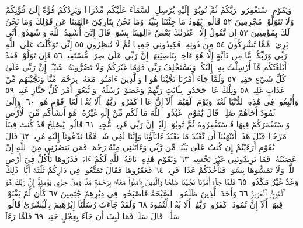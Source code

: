 وَيَٰقَوْمِ ٱسْتَغْفِرُوا۟ رَبَّكُمْ ثُمَّ تُوبُوٓا۟ إِلَيْهِ يُرْسِلِ ٱلسَّمَآءَ
عَلَيْكُم مِّدْرَارࣰا وَيَزِدْكُمْ قُوَّةً إِلَىٰ قُوَّتِكُمْ وَلَا تَتَوَلَّوْا۟
مُجْرِمِينَ ٥٢ قَالُوا۟ يَٰهُودُ مَا جِئْتَنَا بِبَيِّنَةࣲ وَمَا نَحْنُ
بِتَارِكِيٓ ءَالِهَتِنَا عَن قَوْلِكَ وَمَا نَحْنُ لَكَ بِمُؤْمِنِينَ ٥٣
إِن نَّقُولُ إِلَّا ٱعْتَرَىٰكَ بَعْضُ ءَالِهَتِنَا بِسُوٓءࣲۗ قَالَ إِنِّيٓ أُشْهِدُ ٱللَّهَ
وَٱشْهَدُوٓا۟ أَنِّي بَرِيٓءࣱ مِّمَّا تُشْرِكُونَ ٥٤ مِن دُونِهِۦۖ فَكِيدُونِي
جَمِيعࣰا ثُمَّ لَا تُنظِرُونِ ٥٥ إِنِّي تَوَكَّلْتُ عَلَى ٱللَّهِ رَبِّي وَرَبِّكُمۚ مَّا مِن
دَآبَّةٍ إِلَّا هُوَ ءَاخِذُۢ بِنَاصِيَتِهَآۚ إِنَّ رَبِّي عَلَىٰ صِرَٰطࣲ مُّسْتَقِيمࣲ ٥٦
فَإِن تَوَلَّوْا۟ فَقَدْ أَبْلَغْتُكُم مَّآ أُرْسِلْتُ بِهِۦٓ إِلَيْكُمْۚ وَيَسْتَخْلِفُ رَبِّي
قَوْمًا غَيْرَكُمْ وَلَا تَضُرُّونَهُۥ شَيْـًٔاۚ إِنَّ رَبِّي عَلَىٰ كُلِّ شَيْءٍ حَفِيظࣱ ٥٧
وَلَمَّا جَآءَ أَمْرُنَا نَجَّيْنَا هُودࣰا وَٱلَّذِينَ ءَامَنُوا۟ مَعَهُۥ بِرَحْمَةࣲ مِّنَّا
وَنَجَّيْنَٰهُم مِّنْ عَذَابٍ غَلِيظࣲ ٥٨ وَتِلْكَ عَادࣱۖ جَحَدُوا۟ بِـَٔايَٰتِ
رَبِّهِمْ وَعَصَوْا۟ رُسُلَهُۥ وَٱتَّبَعُوٓا۟ أَمْرَ كُلِّ جَبَّارٍ عَنِيدࣲ ٥٩ وَأُتْبِعُوا۟ فِي
هَٰذِهِ ٱلدُّنْيَا لَعْنَةࣰ وَيَوْمَ ٱلْقِيَٰمَةِۗ أَلَآ إِنَّ عَادࣰا كَفَرُوا۟ رَبَّهُمْۗ أَلَا
بُعْدࣰا لِّعَادࣲ قَوْمِ هُودࣲ ٦٠۞ وَإِلَىٰ ثَمُودَ أَخَاهُمْ صَٰلِحࣰاۚ قَالَ يَٰقَوْمِ
ٱعْبُدُوا۟ ٱللَّهَ مَا لَكُم مِّنْ إِلَٰهٍ غَيْرُهُۥۖ هُوَ أَنشَأَكُم مِّنَ ٱلْأَرْضِ
وَٱسْتَعْمَرَكُمْ فِيهَا فَٱسْتَغْفِرُوهُ ثُمَّ تُوبُوٓا۟ إِلَيْهِۚ إِنَّ رَبِّي قَرِيبࣱ مُّجِيبࣱ ٦١
قَالُوا۟ يَٰصَٰلِحُ قَدْ كُنتَ فِينَا مَرْجُوࣰّا قَبْلَ هَٰذَآۖ أَتَنْهَىٰنَآ أَن نَّعْبُدَ
مَا يَعْبُدُ ءَابَآؤُنَا وَإِنَّنَا لَفِي شَكࣲّ مِّمَّا تَدْعُونَآ إِلَيْهِ مُرِيبࣲ ٦٢
قَالَ يَٰقَوْمِ أَرَءَيْتُمْ إِن كُنتُ عَلَىٰ بَيِّنَةࣲ مِّن رَّبِّي وَءَاتَىٰنِي
مِنْهُ رَحْمَةࣰ فَمَن يَنصُرُنِي مِنَ ٱللَّهِ إِنْ عَصَيْتُهُۥۖ فَمَا تَزِيدُونَنِي
غَيْرَ تَخْسِيرࣲ ٦٣ وَيَٰقَوْمِ هَٰذِهِۦ نَاقَةُ ٱللَّهِ لَكُمْ ءَايَةࣰۖ
فَذَرُوهَا تَأْكُلْ فِيٓ أَرْضِ ٱللَّهِۖ وَلَا تَمَسُّوهَا بِسُوٓءࣲ فَيَأْخُذَكُمْ
عَذَابࣱ قَرِيبࣱ ٦٤ فَعَقَرُوهَا فَقَالَ تَمَتَّعُوا۟ فِي دَارِكُمْ
ثَلَٰثَةَ أَيَّامࣲۖ ذَٰلِكَ وَعْدٌ غَيْرُ مَكْذُوبࣲ ٦٥ فَلَمَّا جَآءَ أَمْرُنَا
نَجَّيْنَا صَٰلِحࣰا وَٱلَّذِينَ ءَامَنُوا۟ مَعَهُۥ بِرَحْمَةࣲ مِّنَّا وَمِنْ
خِزْيِ يَوْمِئِذٍۚ إِنَّ رَبَّكَ هُوَ ٱلْقَوِيُّ ٱلْعَزِيزُ ٦٦ وَأَخَذَ ٱلَّذِينَ
ظَلَمُوا۟ ٱلصَّيْحَةُ فَأَصْبَحُوا۟ فِي دِيَٰرِهِمْ جَٰثِمِينَ ٦٧
كَأَن لَّمْ يَغْنَوْا۟ فِيهَآۗ أَلَآ إِنَّ ثَمُودَا۟ كَفَرُوا۟ رَبَّهُمْۗ أَلَا
بُعْدࣰا لِّثَمُودَ ٦٨ وَلَقَدْ جَآءَتْ رُسُلُنَآ إِبْرَٰهِيمَ بِٱلْبُشْرَىٰ قَالُوا۟
سَلَٰمࣰاۖ قَالَ سَلَٰمࣱۖ فَمَا لَبِثَ أَن جَآءَ بِعِجْلٍ حَنِيذࣲ ٦٩ فَلَمَّا رَءَآ
